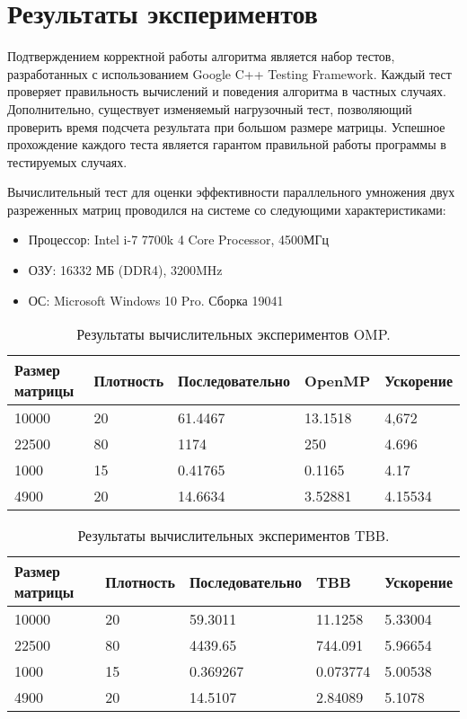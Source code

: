 \documentclass{report}
\begin{document}
\section*{Результаты экспериментов}
\par Подтверждением корректной работы алгоритма является набор тестов, разработанных с использованием Google C++ Testing Framework. Каждый тест проверяет правильность вычислений и поведения алгоритма в частных случаях. Дополнительно, существует изменяемый нагрузочный тест, позволяющий проверить время подсчета результата при большом размере матрицы. Успешное прохождение каждого теста является гарантом правильной работы программы в тестируемых случаях.
\par Вычислительный тест для оценки эффективности параллельного умножения двух разреженных матриц проводился на системе со следующими характеристиками:
\begin{itemize}
\item Процессор: Intel i-7 7700k 4 Core Processor, 4500МГц
\item ОЗУ: 16332 МБ (DDR4), 3200MHz
\item ОС: Microsoft Windows 10 Pro. Сборка 19041
\end{itemize}
\begin{table}[!h]
\begin{tabular}{ | l | l | l | l | | l }
\hline
Размер матрицы & Плотность & Последовательно & OpenMP & Ускорение \\ \hline
10000& 20 & 61.4467 & 13.1518 & 4,672 \\
22500& 80 & 1174 & 250 & 4.696 \\
1000 & 15 & 0.41765 & 0.1165 & 4.17 \\
4900 & 20 & 14.6634 & 3.52881 & 4.15534 \\ \hline
\end{tabular}
\caption{Результаты вычислительных экспериментов OMP.}
\end{table}
\begin{table}[!h]
\begin{tabular}{ | l | l | l | l | | l }
\hline
Размер матрицы & Плотность & Последовательно & TBB & Ускорение \\ \hline
10000& 20 & 59.3011 & 11.1258 & 5.33004 \\
22500& 80 & 4439.65 & 744.091 & 5.96654 \\
1000 & 15 & 0.369267 & 0.073774 & 5.00538 \\
4900 & 20 & 14.5107 & 2.84089 & 5.1078 \\ \hline
\end{tabular}
\caption{Результаты вычислительных экспериментов TBB.}
\end{table}
\end{document}
